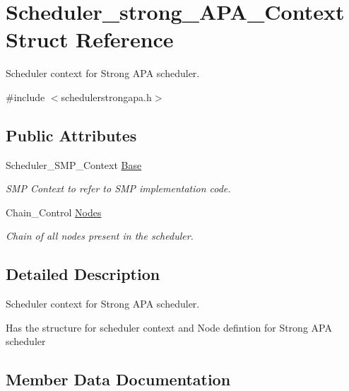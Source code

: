 \hypertarget{structScheduler__strong__APA__Context}{}\section{Scheduler\+\_\+strong\+\_\+\+A\+P\+A\+\_\+\+Context Struct Reference}
\label{structScheduler__strong__APA__Context}


Scheduler context for Strong A\+PA scheduler.  




{\ttfamily \#include $<$schedulerstrongapa.\+h$>$}

\subsection*{Public Attributes}
\begin{DoxyCompactItemize}
\item 
Scheduler\+\_\+\+S\+M\+P\+\_\+\+Context \hyperlink{structScheduler__strong__APA__Context_a55755b445b7e7beaf1b87b178521e615}{Base}
\begin{DoxyCompactList}\small\item\em S\+MP Context to refer to S\+MP implementation code. \end{DoxyCompactList}\item 
Chain\+\_\+\+Control \hyperlink{structScheduler__strong__APA__Context_a07cebd5016654b5c7d05ec9982449d4d}{Nodes}
\begin{DoxyCompactList}\small\item\em Chain of all nodes present in the scheduler. \end{DoxyCompactList}\end{DoxyCompactItemize}


\subsection{Detailed Description}
Scheduler context for Strong A\+PA scheduler. 

Has the structure for scheduler context and Node defintion for Strong A\+PA scheduler 

\subsection{Member Data Documentation}
\mbox{\label{structScheduler__strong__APA__Context_a55755b445b7e7beaf1b87b178521e615}} 
